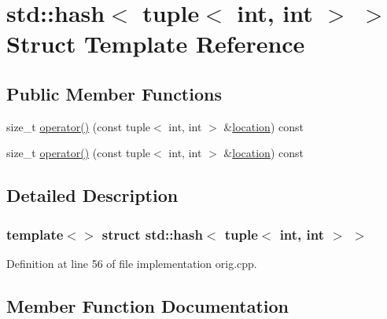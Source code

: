 \hypertarget{structstd_1_1hash_3_01tuple_3_01int_00_01int_01_4_01_4}{}\section{std\+:\+:hash$<$ tuple$<$ int, int $>$ $>$ Struct Template Reference}
\label{structstd_1_1hash_3_01tuple_3_01int_00_01int_01_4_01_4}
\subsection*{Public Member Functions}
\begin{DoxyCompactItemize}
\item 
size\+\_\+t \mbox{\hyperlink{structstd_1_1hash_3_01tuple_3_01int_00_01int_01_4_01_4_af46854ec2c5aa6cd6d1cd164374bd54f}{operator()}} (const tuple$<$ int, int $>$ \&\mbox{\hyperlink{glad_8h_a050778a7129cc14e57da7024beb87ce8}{location}}) const
\item 
size\+\_\+t \mbox{\hyperlink{structstd_1_1hash_3_01tuple_3_01int_00_01int_01_4_01_4_af46854ec2c5aa6cd6d1cd164374bd54f}{operator()}} (const tuple$<$ int, int $>$ \&\mbox{\hyperlink{glad_8h_a050778a7129cc14e57da7024beb87ce8}{location}}) const
\end{DoxyCompactItemize}


\subsection{Detailed Description}
\subsubsection*{template$<$$>$\newline
struct std\+::hash$<$ tuple$<$ int, int $>$ $>$}



Definition at line 56 of file implementation orig.\+cpp.



\subsection{Member Function Documentation}
\mbox{\label{structstd_1_1hash_3_01tuple_3_01int_00_01int_01_4_01_4_af46854ec2c5aa6cd6d1cd164374bd54f}} 
